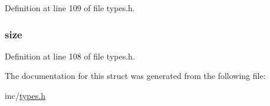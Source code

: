 Definition at line 109 of file types.h.

\hypertarget{structmem_area_a854352f53b148adc24983a58a1866d66}{
\subsubsection[{size}]{ {\bf size}}}
\label{structmem_area_a854352f53b148adc24983a58a1866d66}


Definition at line 108 of file types.h.



The documentation for this struct was generated from the following file:\begin{DoxyCompactItemize}
\item 
inc/\hyperlink{types_8h}{types.h}\end{DoxyCompactItemize}
